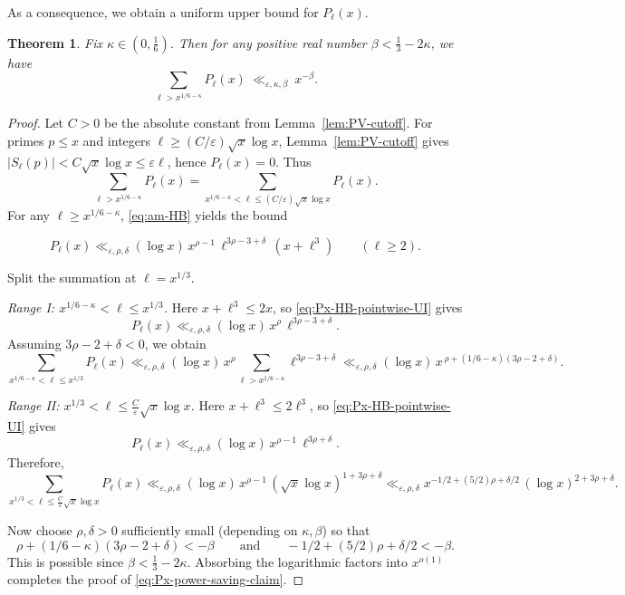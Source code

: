 \documentclass[11pt,letterpaper,reqno]{amsart}
\newtheorem{theorem}{Theorem}[section]
\theoremstyle{definition}
\numberwithin{equation}{section}
\newcommand{\eps}{\varepsilon}
\newcommand{\1}{\mathbf{1}}
\begin{document}
As a consequence, we obtain a uniform upper bound for $P_{\ell}(x)$.


\begin{theorem}\label{lem:Px-large-o1}
Fix $\kappa\in (0,\frac{1}{6})$. Then for any positive real number $\beta<\frac{1}{3}-2\kappa$, we have 
\begin{equation}\label{eq:Px-power-saving-claim}
\sum_{\ell> x^{1/6-\kappa}} P_{\ell}(x)\ \ll_{\varepsilon,\kappa,\beta}\ x^{-\beta}.
\end{equation}
\end{theorem}

\begin{proof}
    Let $C>0$ be the absolute constant from Lemma~\ref{lem:PV-cutoff}. For primes $p\le x$ and integers $\ell \geq(C/\eps)\sqrt{x}\log x$, Lemma~\ref{lem:PV-cutoff} gives
$|S_\ell(p)|< C\sqrt{x}\log x \leq \varepsilon\ell$, hence $P_{\ell}(x)=0$. Thus
\[
\sum_{\ell> x^{1/6-\kappa}} P_{\ell}(x)=\sum_{x^{1/6-\kappa}<\ell\le (C/\eps)\sqrt{x}\log x} P_{\ell}(x).
\]For any $\ell\ge x^{1/6-\kappa}$, \eqref{eq:am-HB} yields the bound

\begin{equation}\label{eq:Px-HB-pointwise-UI}
P_{\ell}(x)\ll_{\varepsilon,\rho,\delta}
(\log x)\,x^{\rho-1}\,\ell^{3\rho-3+\delta}\,(x+\ell^3)
\qquad(\ell\ge 2).
\end{equation}

Split the summation at $\ell=x^{1/3}$.
\smallskip

\noindent\emph{Range I: $x^{1/6-\kappa}<\ell\le x^{1/3}$.}
Here $x+\ell^3\le 2x$, so \eqref{eq:Px-HB-pointwise-UI} gives
\[
P_{\ell}(x)\ll_{\varepsilon,\rho,\delta} (\log x)\,x^\rho\,\ell^{3\rho-3+\delta}.
\]
Assuming $3\rho-2+\delta<0$, we obtain
\[
\sum_{x^{1/6-\kappa}<\ell\le x^{1/3}}P_{\ell}(x)
\ll_{\varepsilon,\rho,\delta} (\log x)\,x^\rho \sum_{\ell>x^{1/6-\kappa}}\ell^{3\rho-3+\delta}
\ll_{\varepsilon,\rho,\delta} (\log x)\,x^{\,\rho+(1/6-\kappa)(3\rho-2+\delta)}.
\]

\noindent\emph{Range II: $x^{1/3}<\ell\le \frac{C}{\eps}\sqrt{x}\log x$.}
Here $x+\ell^3 \leq 2\ell^3$, so \eqref{eq:Px-HB-pointwise-UI} gives
\[
P_{\ell}(x)\ll_{\varepsilon,\rho,\delta} (\log x)\,x^{\rho-1}\,\ell^{3\rho+\delta}.
\]
Therefore,
\[
\sum_{x^{1/3}<\ell\le \frac{C}{\eps}\sqrt{x}\log x}P_{\ell}(x)
\ll_{\varepsilon,\rho,\delta} (\log x)\,x^{\rho-1}\,(\sqrt{x}\log x)^{1+3\rho+\delta}
\ll_{\varepsilon,\rho,\delta} x^{-1/2+(5/2)\rho+\delta/2}\,(\log x)^{2+3\rho+\delta}.
\]

Now choose $\rho,\delta>0$ sufficiently small (depending on $\kappa,\beta$) so that
\[
\rho+(1/6-\kappa)(3\rho-2+\delta)< -\beta
\qquad\text{and}\qquad
-1/2+(5/2)\rho+\delta/2< -\beta.
\]
This is possible since $\beta<\frac{1}{3}-2\kappa$.
Absorbing the logarithmic factors into $x^{o(1)}$ completes the proof of \eqref{eq:Px-power-saving-claim}.
\end{proof}
\end{document}
